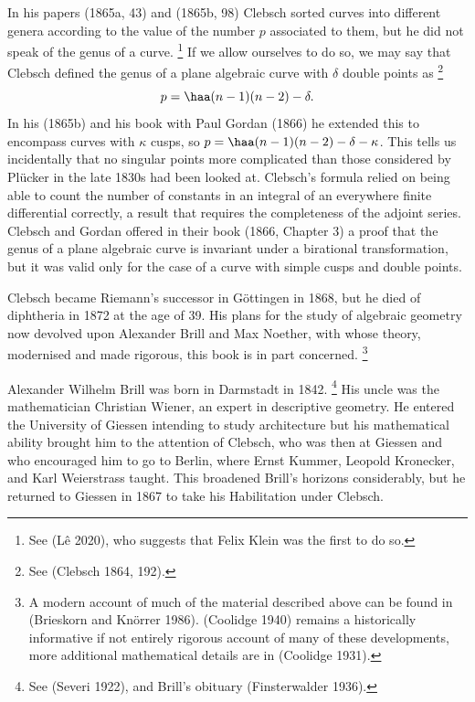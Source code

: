 In his papers (1865a, 43) and (1865b, 98) Clebsch sorted curves into
%
different genera according to the value of the number $p$ associated
to them, but he did not speak of the genus of a curve.%
%
\footnote{See
(L\^e 2020), who suggests that Felix Klein
%
was the first to do so.} 
%
If
we allow ourselves to do so, we may say that Clebsch defined the genus
of a plane algebraic curve with $\delta$ double points as%
%
\footnote{See (Clebsch 1864, 192).}
%
$$p = \haa (n-1)(n-2) - \delta.$$
In his (1865b) and his book with Paul Gordan
%
(1866) he extended this to
encompass curves with
$\kappa$ cusps,
%
 so $p= \haa (n-1)(n-2) - \delta - \kappa$. This tells
us incidentally that no singular points more complicated than those
considered by Pl\"ucker in the late 1830s had been looked at. Clebsch's
%
formula relied on being able to count the number of constants in an
integral of an everywhere finite differential correctly, a result that
requires the  completeness of the adjoint series. Clebsch and Gordan offered
in their book (1866, Chapter 3) a proof that the genus of a plane
algebraic curve is invariant under a birational transformation,
%
 but it was
valid only for the case of a curve with simple cusps and double points.
%

Clebsch became   Riemann's successor in G\"ottingen
%
in 1868, but  he
died of diphtheria in 1872 at the age of 39. His plans for the study of
algebraic geometry now devolved upon Alexander Brill
%
and Max Noether,
%
with whose theory, modernised and made rigorous,  this book is in part
concerned.%
%
\footnote{A modern account of  much of the material described
above can be found in (Brieskorn and Kn\"orrer 1986). (Coolidge 1940)
remains a historically informative if not entirely rigorous account of
many of these developments, more additional mathematical details are in
(Coolidge 1931).}

Alexander Wilhelm Brill was born in Darmstadt in 1842.%
%
\footnote{See
(Severi 1922),  and Brill's obituary (Finsterwalder 1936).}
%
His  uncle was
the mathematician Christian Wiener,
%
 an expert in descriptive geometry.
%
 He
entered the University of Giessen
%
intending to study architecture but his
mathematical ability brought him to the attention of Clebsch, who was then
at Giessen and who encouraged him to go  to Berlin, where  Ernst
Kummer,
%
Leopold Kronecker,
%
 and Karl Weierstrass
%
taught. This broadened Brill's
horizons considerably, but he returned to Giessen in 1867 to take his
%
Habilitation  under Clebsch.

